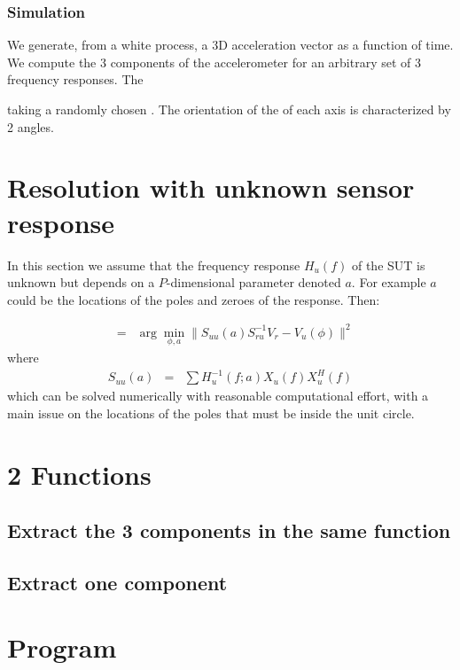 \documentclass[a4paper, 12pt]{report}
\begin{document}
 \subsubsection{Simulation}
 We generate, from a white process, a 3D acceleration vector as a function of time. We compute the 3 components of the accelerometer for an arbitrary set of 3 frequency responses. The 
 
 taking a randomly  chosen . The orientation of the of each axis is characterized by 2 angles.
 
\section{Resolution with unknown sensor response}
In this section we assume that the frequency response $H_{u}(f)$ of the SUT is unknown but depends on a $P$-dimensional parameter denoted $a$. For example $a$ could be the locations of the poles and zeroes of the response.  Then:

\begin{eqnarray*}
[\hat \phi, \hat a] &=& \arg\min_{\phi, a} \|S_{uu}(a)S_{ru}^{-1} V_{r}- V_{u}(\phi)\|^{2}
\end{eqnarray*}
where 
\begin{eqnarray*}
S_{uu}(a) &=&
\sum H_{u}^{-1}(f;a)X_{u}(f)X_{u}^{H}(f)
\end{eqnarray*}
which can be solved numerically with reasonable computational effort, with a  main issue on the locations of the poles that must be inside the unit circle.


\appendix
\section{2 Functions}

\subsection{Extract the 3 components in the same function}
{\tiny }

\subsection{Extract one component}
{\tiny }


\section{Program}

{\tiny }
\end{document}
